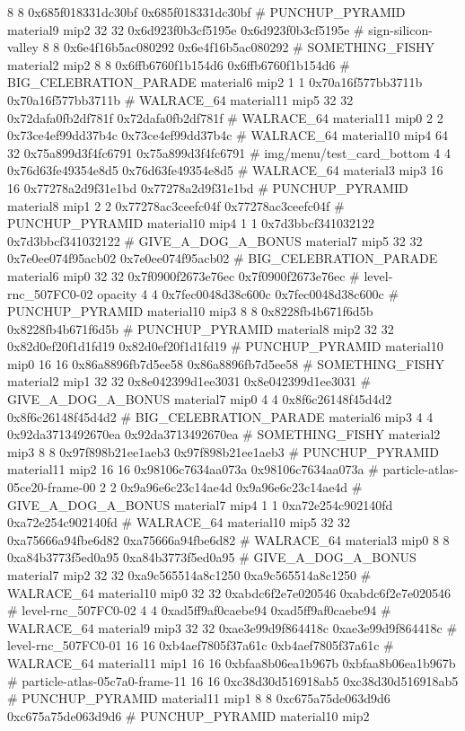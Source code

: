 8 8 0x685f018331dc30bf 0x685f018331dc30bf # PUNCHUP_PYRAMID material9 mip2
32 32 0x6d923f0b3cf5195e 0x6d923f0b3cf5195e # sign-silicon-valley
8 8 0x6e4f16b5ac080292 0x6e4f16b5ac080292 # SOMETHING_FISHY material2 mip2
8 8 0x6ffb6760f1b154d6 0x6ffb6760f1b154d6 # BIG_CELEBRATION_PARADE material6 mip2
1 1 0x70a16f577bb3711b 0x70a16f577bb3711b # WALRACE_64 material11 mip5
32 32 0x72dafa0fb2df781f 0x72dafa0fb2df781f # WALRACE_64 material11 mip0
2 2 0x73ce4ef99dd37b4c 0x73ce4ef99dd37b4c # WALRACE_64 material10 mip4
64 32 0x75a899d3f4fc6791 0x75a899d3f4fc6791 # img/menu/test_card_bottom
4 4 0x76d63fe49354e8d5 0x76d63fe49354e8d5 # WALRACE_64 material3 mip3
16 16 0x77278a2d9f31e1bd 0x77278a2d9f31e1bd # PUNCHUP_PYRAMID material8 mip1
2 2 0x77278ac3ceefc04f 0x77278ac3ceefc04f # PUNCHUP_PYRAMID material10 mip4
1 1 0x7d3bbcf341032122 0x7d3bbcf341032122 # GIVE_A_DOG_A_BONUS material7 mip5
32 32 0x7e0ee074f95acb02 0x7e0ee074f95acb02 # BIG_CELEBRATION_PARADE material6 mip0
32 32 0x7f0900f2673e76ec 0x7f0900f2673e76ec # level-rnc_507FC0-02 opacity
4 4 0x7fec0048d38c600c 0x7fec0048d38c600c # PUNCHUP_PYRAMID material10 mip3
8 8 0x8228fb4b671f6d5b 0x8228fb4b671f6d5b # PUNCHUP_PYRAMID material8 mip2
32 32 0x82d0ef20f1d1fd19 0x82d0ef20f1d1fd19 # PUNCHUP_PYRAMID material10 mip0
16 16 0x86a8896fb7d5ee58 0x86a8896fb7d5ee58 # SOMETHING_FISHY material2 mip1
32 32 0x8e042399d1ee3031 0x8e042399d1ee3031 # GIVE_A_DOG_A_BONUS material7 mip0
4 4 0x8f6c26148f45d4d2 0x8f6c26148f45d4d2 # BIG_CELEBRATION_PARADE material6 mip3
4 4 0x92da3713492670ea 0x92da3713492670ea # SOMETHING_FISHY material2 mip3
8 8 0x97f898b21ee1aeb3 0x97f898b21ee1aeb3 # PUNCHUP_PYRAMID material11 mip2
16 16 0x98106c7634aa073a 0x98106c7634aa073a # particle-atlas-05ce20-frame-00
2 2 0x9a96e6c23c14ae4d 0x9a96e6c23c14ae4d # GIVE_A_DOG_A_BONUS material7 mip4
1 1 0xa72e254c902140fd 0xa72e254c902140fd # WALRACE_64 material10 mip5
32 32 0xa75666a94fbe6d82 0xa75666a94fbe6d82 # WALRACE_64 material3 mip0
8 8 0xa84b3773f5ed0a95 0xa84b3773f5ed0a95 # GIVE_A_DOG_A_BONUS material7 mip2
32 32 0xa9c565514a8c1250 0xa9c565514a8c1250 # WALRACE_64 material10 mip0
32 32 0xabdc6f2e7e020546 0xabdc6f2e7e020546 # level-rnc_507FC0-02
4 4 0xad5ff9af0caebe94 0xad5ff9af0caebe94 # WALRACE_64 material9 mip3
32 32 0xae3e99d9f864418c 0xae3e99d9f864418c # level-rnc_507FC0-01
16 16 0xb4aef7805f37a61c 0xb4aef7805f37a61c # WALRACE_64 material11 mip1
16 16 0xbfaa8b06ea1b967b 0xbfaa8b06ea1b967b # particle-atlas-05c7a0-frame-11
16 16 0xc38d30d516918ab5 0xc38d30d516918ab5 # PUNCHUP_PYRAMID material11 mip1
8 8 0xc675a75de063d9d6 0xc675a75de063d9d6 # PUNCHUP_PYRAMID material10 mip2
